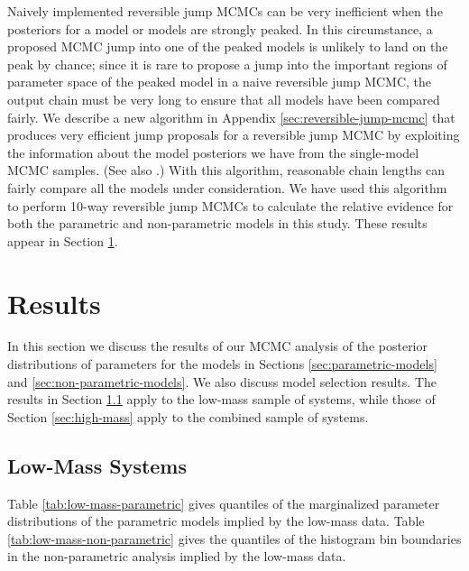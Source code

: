 \documentclass[preprint]{aastex}
\begin{document}
Naively implemented reversible jump MCMCs can be very inefficient when
the posteriors for a model or models are strongly peaked.  In this
circumstance, a proposed MCMC jump into one of the peaked models is
unlikely to land on the peak by chance; since it is rare to propose a
jump into the important regions of parameter space of the peaked model
in a naive reversible jump MCMC, the output chain must be very long to
ensure that all models have been compared fairly.  We describe a new
algorithm in Appendix \ref{sec:reversible-jump-mcmc} that produces
very efficient jump proposals for a reversible jump MCMC by exploiting
the information about the model posteriors we have from the
single-model MCMC samples.  (See also \citet{Farr2010}.)  With this
algorithm, reasonable chain lengths can fairly compare all the models
under consideration.  We have used this algorithm to perform 10-way
reversible jump MCMCs to calculate the relative evidence for both the
parametric and non-parametric models in this study.  These results
appear in Section \ref{sec:results}.

\section{Results}
\label{sec:results}

In this section we discuss the results of our MCMC analysis of the
posterior distributions of parameters for the models in Sections
\ref{sec:parametric-models} and \ref{sec:non-parametric-models}.  We
also discuss model selection results.  The results in Section
\ref{sec:results-low-mass} apply to the low-mass sample of
systems, while those of Section \ref{sec:high-mass} apply to the
combined sample of systems.

\subsection{Low-Mass Systems}
\label{sec:results-low-mass}

Table \ref{tab:low-mass-parametric} gives quantiles of the
marginalized parameter distributions of the parametric models implied
by the low-mass data.  Table \ref{tab:low-mass-non-parametric} gives
the quantiles of the histogram bin boundaries in the non-parametric
analysis implied by the low-mass data.
\end{document}
